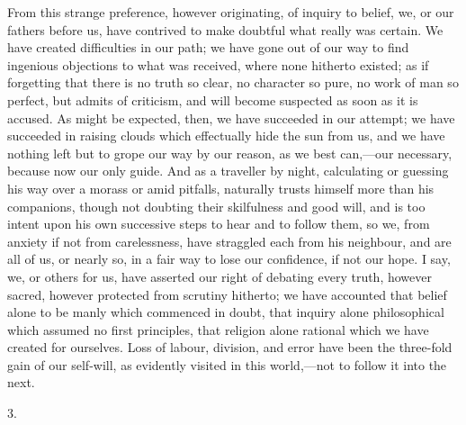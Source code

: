 From this strange preference, however originating, of inquiry to
belief, we, or our fathers before us, have contrived to make doubtful
what really was certain. We have created difficulties in our path; we
have gone out of our way to find ingenious objections to what was
received, where none hitherto existed; as if forgetting that there is
no truth so clear, no character so pure, no work of man so perfect,
but admits of criticism, and will become suspected as soon as it is
accused. As might be expected, then, we have succeeded in our attempt;
we have succeeded in raising clouds which effectually hide the sun
from us, and we have nothing left but to grope our way by our reason,
as we best can,—our necessary, because now our only guide. And as a
traveller by night, calculating or guessing his way over a morass or
amid pitfalls, naturally trusts himself more than his companions,
though not doubting their skilfulness and good will, and is too intent
upon his own successive steps to hear and to follow them, so we, from
anxiety if not from carelessness, have straggled each from his
neighbour, and are all of us, or nearly so, in a fair way to lose our
confidence, if not our hope. I say, we, or others for us, have
asserted our right of debating every truth, however sacred, however
protected from scrutiny hitherto; we have accounted that belief alone
to be manly which commenced in doubt, that inquiry alone philosophical
which assumed no first principles, that religion alone rational which
we have created for ourselves. Loss of labour, division, and error
have been the three-fold gain of our self-will, as evidently
visited in this world,—not to follow it into the next.

3.

